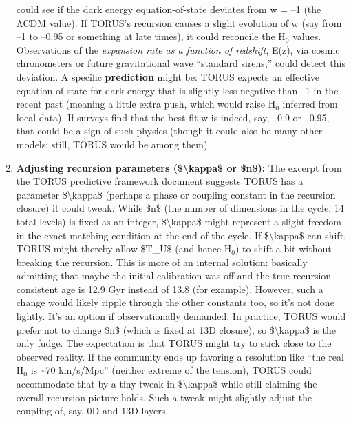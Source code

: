 \documentclass[]{article}
\newcommand{\subscript}[1]{\ensuremath{_{\mathrm{#1}}}}
\begin{document}
\begin{enumerate}
  could see if the dark energy equation-of-state deviates from w = --1
  (the ΛCDM value). If TORUS's recursion causes a slight evolution of w
  (say from --1 to --0.95 or something at late times), it could
  reconcile the
  H\subscript{0} values.
  Observations of the \emph{expansion rate as a function of redshift},
  E(z), via cosmic chronometers or future gravitational wave ``standard
  sirens,'' could detect this deviation. A specific \textbf{prediction}
  might be: TORUS expects an effective equation-of-state for dark energy
  that is slightly less negative than --1 in the recent past (meaning a
  little extra push, which would raise
  H\subscript{0} inferred
  from local data)​. If surveys find that the best-fit w is indeed, say,
  --0.9 or --0.95, that could be a sign of such physics (though it could
  also be many other models; still, TORUS would be among them).
\item
  \textbf{Adjusting recursion parameters (\$\textbackslash{}kappa\$ or
  \$n\$):} The excerpt from the TORUS predictive framework document
  suggests TORUS has a parameter \$\textbackslash{}kappa\$ (perhaps a
  phase or coupling constant in the recursion closure) it could tweak​.
  While \$n\$ (the number of dimensions in the cycle, 14 total levels)
  is fixed as an integer, \$\textbackslash{}kappa\$ might represent a
  slight freedom in the exact matching condition at the end of the
  cycle. If \$\textbackslash{}kappa\$ can shift, TORUS might thereby
  allow \$T\_U\$ (and hence
  H\subscript{0}) to shift
  a bit without breaking the recursion. This is more of an internal
  solution: basically admitting that maybe the initial calibration was
  off and the true recursion-consistent age is 12.9 Gyr instead of 13.8
  (for example). However, such a change would likely ripple through the
  other constants too, so it's not done lightly. It's an option if
  observationally demanded. In practice, TORUS would prefer not to
  change \$n\$ (which is fixed at 13D closure), so
  \$\textbackslash{}kappa\$ is the only fudge. The expectation is that
  TORUS might try to stick close to the observed reality. If the
  community ends up favoring a resolution like ``the real
  H\subscript{0} is
  \textasciitilde{}70 km/s/Mpc'' (neither extreme of the tension), TORUS
  could accommodate that by a tiny tweak in \$\textbackslash{}kappa\$
  while still claiming the overall recursion picture holds​. Such a
  tweak might slightly adjust the coupling of, say, 0D and 13D layers.
\end{enumerate}
\end{document}
